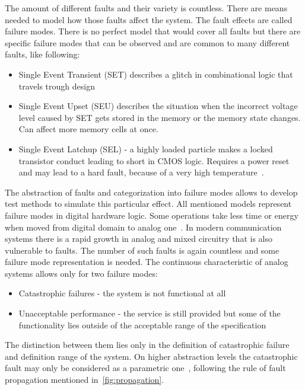 The amount of different faults and their variety is countless. There are means needed to model how those faults affect the system. The fault effects are called failure modes. There is no perfect model that would cover all faults but there are specific failure modes that can be observed and are common to many different faults, like following:
\begin{itemize}
    \item Single Event Transient (SET) describes a glitch in combinational logic that travels trough design
    \item Single Event Upset (SEU) describes the situation when the incorrect voltage level caused by SET gets stored in the memory or the memory state changes. Can affect more memory cells at once.
    \item Single Event Latchup (SEL) - a highly loaded particle makes a locked transistor conduct leading to short in CMOS logic. Requires a power reset and may lead to a hard fault, because of a very high temperature~\cite{report:altera}.
\end{itemize}
The abstraction of faults and categorization into failure modes allows to develop test methods to simulate this particular effect. All mentioned models represent failure modes in digital hardware logic. Some operations take less time or energy when moved from digital domain to analog one~\cite{Prof Vierhaus Lectures}. In modern communication systems there is a rapid growth in analog and mixed circuitry that is also vulnerable to faults. The number of such faults is again countless and some failure mode representation is needed. The continuous characteristic of analog systems allows only for two failure modes:
\begin{itemize}
    \item Catastrophic failures - the system is not functional at all
    \item Unacceptable performance - the service is still provided but some of the functionality lies outside of the acceptable range of the specification
\end{itemize}
The distinction between them lies only in the definition of catastrophic failure and definition range of the system. On higher abstraction levels the catastrophic fault may only be considered as a parametric one~\cite{book:Kabisatpathy}, following the rule of fault propagation mentioned in~\autoref{fig:propagation}.

